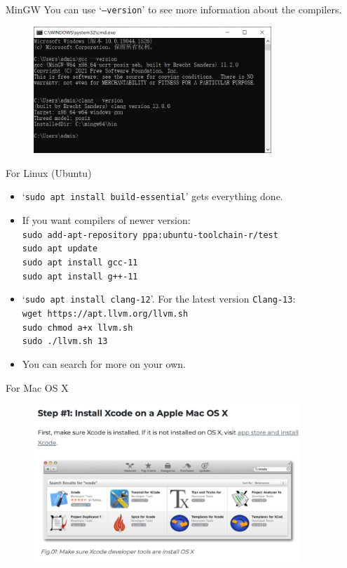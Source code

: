 \documentclass[handout]{beamer}
\begin{document}
\begin{frame}{MinGW}
    You can use `\texttt{--version}' to see more information about the compilers.
    \begin{figure}[h]
        \centering
        \includegraphics[width=0.8\textwidth]{img/compiler_versions.png}
    \end{figure}
\end{frame}

\begin{frame}{For Linux (Ubuntu)}
    \begin{itemize}
        \item `\texttt{sudo apt install build-essential}' gets everything done.
        \item If you want compilers of newer version:\\
        \texttt{sudo add-apt-repository ppa:ubuntu-toolchain-r/test}\\
        \texttt{sudo apt update}\\
        \texttt{sudo apt install gcc-11}\\
        \texttt{sudo apt install g++-11}
        \item `\texttt{sudo apt install clang-12}'. For the latest version \texttt{Clang-13}:\\
        \texttt{wget https://apt.llvm.org/llvm.sh}\\
        \texttt{sudo chmod a+x llvm.sh}\\
        \texttt{sudo ./llvm.sh 13}
        \item You can search for more on your own.
    \end{itemize}
\end{frame}

\begin{frame}{For Mac OS X}
    \begin{figure}[h]
        \centering
        \includegraphics[width=0.9\textwidth]{img/install_xcode.png}
    \end{figure}
\end{frame}
\end{document}
